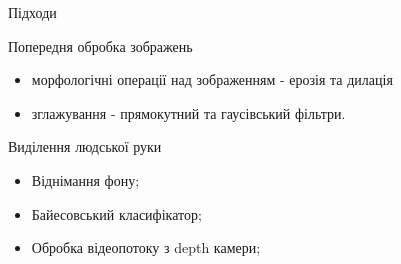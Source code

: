 \begin{frame}{Підходи}\manimate
	\begin{block}{Попередня обробка зображень}
		\begin{itemize}
			\item морфологічні операції над зображенням -  ерозія та дилація
			\item зглажування - прямокутний та гаусівський фільтри.
		\end{itemize}
	\end{block}
	\begin{block}{Виділення людської руки}
		\begin{itemize}
			\item Віднімання фону;
			\item Байесовський класифікатор;
			\item Обробка відеопотоку з depth камери;
		\end{itemize}
	\end{block}	
\end{frame}